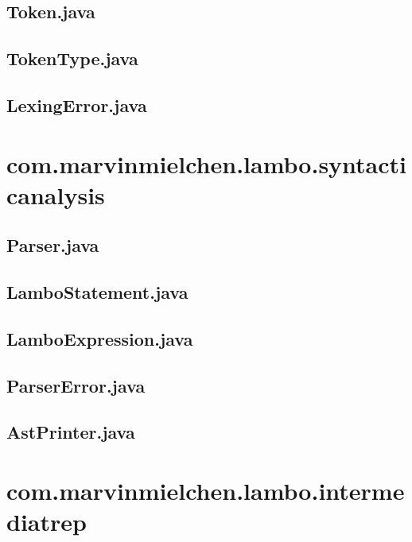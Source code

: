 \documentclass[ngerman]{article}
\begin{document}
\subsection{Token.java}


\subsection{TokenType.java}


\subsection{LexingError.java}


\section{com.marvinmielchen.lambo.syntacticanalysis}

\subsection{Parser.java}


\subsection{LamboStatement.java}


\subsection{LamboExpression.java}


\subsection{ParserError.java}

\subsection{AstPrinter.java}

\section{com.marvinmielchen.lambo.intermediatrep}
\end{document}
